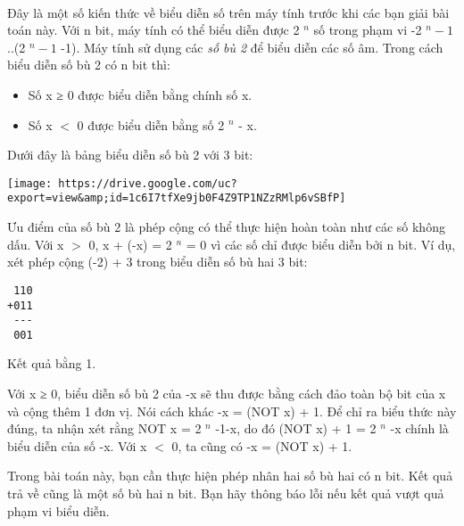 

Đây là một số kiến thức về biểu diễn số trên máy tính trước khi các bạn giải bài toán này. Với n bit, máy tính có thể biểu diễn được 2 $^ n $ số trong phạm vi -2 $^ n-1 $ ..(2 $^ n-1 $ -1). Máy tính sử dụng các \emph{ số bù 2 } để biểu diễn các số âm. Trong cách biểu diễn số bù 2 có n bit thì:
\begin{itemize}
	\item Số x ≥ 0 được biểu diễn bằng chính số x.
	\item Số x $<$ 0 được biểu diễn bằng số 2 $^ n $ - x.
\end{itemize}

Dưới đây là bảng biểu diễn số bù 2 với 3 bit:


\texttt{[image: https://drive.google.com/uc?export=view\&amp;id=1c6I7tfXe9jb0F4Z9TP1NZzRMlp6vSBfP]}

Ưu điểm của số bù 2 là phép cộng có thể thực hiện hoàn toàn như các số không dấu. Với x $>$ 0, x + (-x) = 2 $^ n $ = 0 vì các số chỉ được biểu diễn bởi n bit. Ví dụ, xét phép cộng (-2) + 3 trong biểu diễn số bù hai 3 bit:
\begin{verbatim}
 110
+011
 ---
 001
\end{verbatim}

Kết quả bằng 1.

Với x ≥ 0, biểu diễn số bù 2 của -x sẽ thu được bằng cách đảo toàn bộ bit của x và cộng thêm 1 đơn vị. Nói cách khác -x = (NOT x) + 1. Để chỉ ra biểu thức này đúng, ta nhận xét rằng NOT x = 2 $^ n $ -1-x, do đó (NOT x) + 1 = 2 $^ n $ -x chính là biểu diễn của số -x. Với x $<$ 0, ta cũng có -x = (NOT x) + 1.

Trong bài toán này, bạn cần thực hiện phép nhân hai số bù hai có n bit. Kết quả trả về cũng là một số bù hai n bit. Bạn hãy thông báo lỗi nếu kết quả vượt quả phạm vi biểu diễn.
